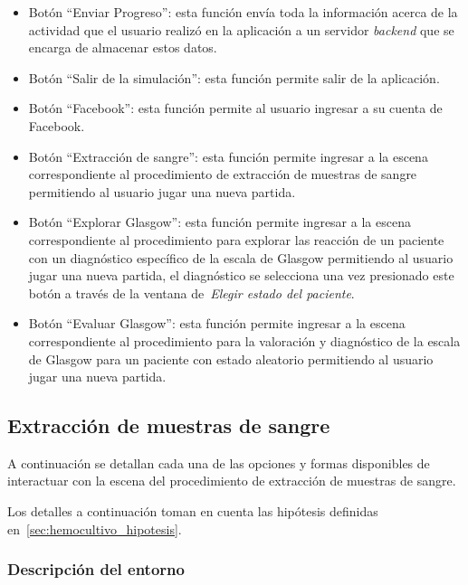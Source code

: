 \begin{itemize}
\item Botón \enquote{Enviar Progreso}: esta función envía toda la información
    acerca de la actividad que el usuario realizó en la aplicación a un servidor
    \emph{backend} que se encarga de almacenar estos datos.
\item Botón \enquote{Salir de la simulación}: esta función permite salir de la
    aplicación.
\item Botón \enquote{Facebook}: esta función permite al usuario ingresar a su
    cuenta de Facebook.
\item Botón \enquote{Extracción de sangre}: esta función permite ingresar a la
    escena correspondiente al procedimiento de extracción de muestras de sangre
    permitiendo al usuario jugar una nueva partida.
\item Botón \enquote{Explorar Glasgow}: esta función permite ingresar a la
    escena correspondiente al procedimiento para explorar las reacción de un
    paciente con un diagnóstico específico de la escala de Glasgow permitiendo
    al usuario jugar una nueva partida, el diagnóstico se selecciona una vez
    presionado este botón a través de la ventana de~\emph{Elegir estado del
        paciente}.
\item Botón \enquote{Evaluar Glasgow}: esta función permite ingresar a la escena
    correspondiente al procedimiento para la valoración y diagnóstico de la
    escala de Glasgow para un paciente con estado aleatorio permitiendo al
    usuario jugar una nueva partida.
\end{itemize}


\subsection{Extracción de muestras de sangre}

A continuación se detallan cada una de las opciones y formas disponibles de
interactuar con la escena del procedimiento de extracción de muestras de sangre.

Los detalles a continuación toman en cuenta las hipótesis definidas
en~\ref{sec:hemocultivo_hipotesis}. 

\subsubsection{Descripción del entorno}



